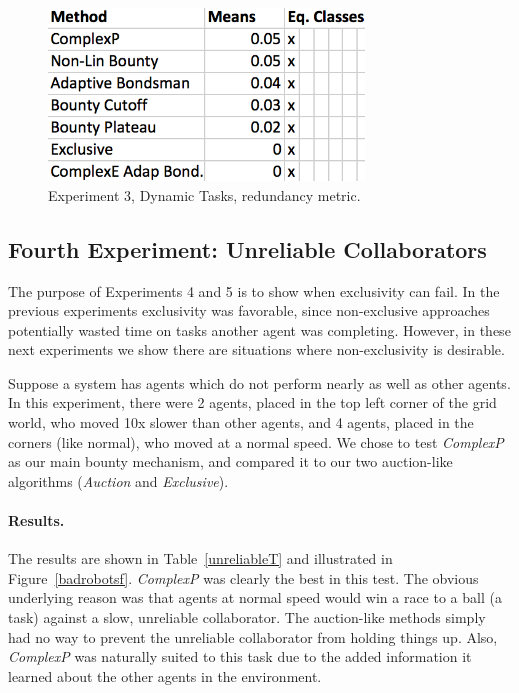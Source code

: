 \documentclass[letterpaper]{aamas2015}
\newcommand\paragrapha[1]{\paragraph*{{#1}.}}
\begin{document}
\begin{figure}[t]
\begin{center}\includegraphics[width=3.3in]{rotR.png}\end{center}
\vspace{-0.5em}\caption{Experiment 3, Dynamic Tasks, redundancy metric.}
\label{rotR}
\end{figure}



\subsection{Fourth Experiment: Unreliable Collaborators}
The purpose of Experiments 4 and 5 is to show when exclusivity can fail. In the previous experiments exclusivity was favorable, since non-exclusive approaches potentially wasted time on tasks another agent was completing. However, in these next experiments we show there are situations where non-exclusivity is desirable.

Suppose a system has agents which do not perform nearly as well as other agents. In this experiment, there were 2 agents, placed in the top left corner of the grid world, who moved 10x slower than other agents, and 4 agents, placed in the corners (like normal), who moved at a normal speed. We chose to test \textit{ComplexP} as our main bounty mechanism, and compared it to our two auction-like algorithms (\textit{Auction} and \textit{Exclusive}).

\paragrapha{Results} The results are shown in Table~\ref{unreliableT} and illustrated in Figure~\ref{badrobotsf}.  \textit{ComplexP} was clearly the best in this test. The obvious underlying reason was that agents at normal speed would win a race to a ball (a task) against a slow, unreliable collaborator.  The auction-like methods simply had no way to prevent the unreliable collaborator from holding things up.  Also, \textit{ComplexP} was naturally suited to this task due to the added information it learned about the other agents in the environment.
\end{document}
